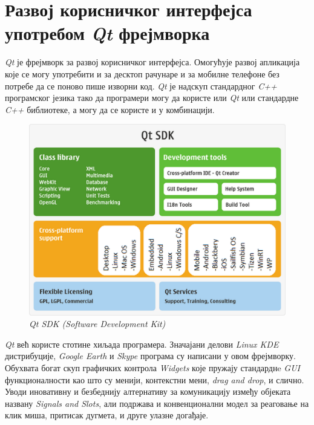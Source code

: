 \documentclass[12pt,a4paper,serbian,oneside]{book}
\begin{document}
%
%
%

\chapter{Развој корисничког интерфејса употребом \textit{Qt} фрејмворка}

\textit{Qt} је фрејмворк за развој корисничког интерфејса. Омогућује развој апликација које се могу употребити и за десктоп рачунаре и за мобилне телефоне без потребе да се поново пише изворни код. \textit{Qt} је надскуп стандардног \textit{C++} програмског језика тако да програмери могу да користе или \textit{Qt} или стандардне \textit{C++} библиотеке, а могу да се користе и у комбинацији.

\begin{figure}[htb]
\begin{center}
\includegraphics[width=150mm]{images/qt_platforms.png}
\end{center}
\caption{\textit{Qt SDK (Software Development Kit)}}
\label{fig:qtsdk}
\end{figure}

\textit{Qt} већ користе стотине хиљада програмера. Значајани делови \textit{Linux KDE} дистрибуције, \textit{Google Earth} и \textit{Skype} програма су написани у овом фрејмворку. Обухвата богат скуп графичких контрола \textit{Widgets} које пружају стандарднe \textit{GUI} функционалности као што су менији, контекстни мени, \textit{drag and drop}, и слично. Уводи иновативну и безбеднију алтернативу за комуникацију између објеката названу \textit{Signals and Slots}, али подржава и конвенционални модел за реаговање на клик миша, притисак дугмета, и друге улазне догађаје.
\end{document}
